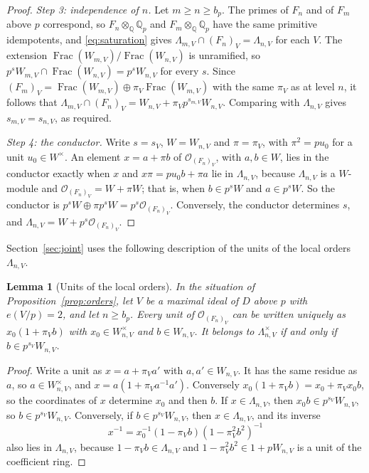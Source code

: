 \documentclass[11pt]{article}
\theoremstyle{plain}
\newtheorem{lemma}[theorem]{Lemma}
\theoremstyle{definition}
\theoremstyle{remark}
\DeclareMathOperator{\Frac}{Frac}
\newcommand{\Q}{\mathbb Q}
\newcommand{\OO}{\mathcal O}
\begin{document}
\begin{proof}
\emph{Step 3: independence of $n$.}  Let $m\geq n\geq b_p$.  The primes
of $F_n$ and of $F_m$ above $p$ correspond, so $F_n\otimes_\Q\Q_p$ and
$F_m\otimes_\Q\Q_p$ have the same primitive idempotents, and
\eqref{eq:saturation} gives
$\Lambda_{m,V}\cap(F_n)_V=\Lambda_{n,V}$ for each $V$.  The extension
$\Frac(W_{m,V})/\Frac(W_{n,V})$ is unramified, so
$p^sW_{m,V}\cap\Frac(W_{n,V})=p^sW_{n,V}$ for every $s$.  Since
$(F_m)_V=\Frac(W_{m,V})\oplus\pi_V\Frac(W_{m,V})$ with the same
$\pi_V$ as at level $n$, it follows that
$\Lambda_{m,V}\cap(F_n)_V=W_{n,V}+\pi_Vp^{s_{m,V}}W_{n,V}$.  Comparing
with $\Lambda_{n,V}$ gives $s_{m,V}=s_{n,V}$, as required.

\emph{Step 4: the conductor.}  Write $s=s_V$, $W=W_{n,V}$ and
$\pi=\pi_V$, with $\pi^2=pu_0$ for a unit $u_0\in W^\times$.  An element
$x=a+\pi b$ of $\OO_{(F_n)_V}$, with $a,b\in W$, lies in the conductor
exactly when $x$ and $x\pi=pu_0b+\pi a$ lie in $\Lambda_{n,V}$, because
$\Lambda_{n,V}$ is a $W$-module and $\OO_{(F_n)_V}=W+\pi W$; that is,
when $b\in p^sW$ and $a\in p^sW$.  So the conductor is
$p^sW\oplus\pi p^sW=p^s\OO_{(F_n)_V}$.  Conversely, the conductor
determines $s$, and $\Lambda_{n,V}=W+p^s\OO_{(F_n)_V}$.
\end{proof}

Section~\ref{sec:joint} uses the following description of the units of
the local orders $\Lambda_{n,V}$.

\begin{lemma}[Units of the local orders]\label{lem:order-units}
In the situation of Proposition~\ref{prop:orders}, let $V$ be a maximal
ideal of $D$ above $p$ with $e(V/p)=2$, and let $n\geq b_p$.  Every unit
of $\OO_{(F_n)_V}$ can be written uniquely as $x_0(1+\pi_Vb)$ with
$x_0\in W_{n,V}^{\times}$ and $b\in W_{n,V}$.  It belongs to
$\Lambda_{n,V}^{\times}$ if and only if $b\in p^{s_V}W_{n,V}$.
\end{lemma}
\begin{proof}
Write a unit as $x=a+\pi_Va'$ with $a,a'\in W_{n,V}$.  It has the same
residue as $a$, so $a\in W_{n,V}^\times$, and $x=a(1+\pi_Va^{-1}a')$.
Conversely $x_0(1+\pi_Vb)=x_0+\pi_Vx_0b$, so the coordinates of $x$
determine $x_0$ and then $b$.  If $x\in\Lambda_{n,V}$, then
$x_0b\in p^{s_V}W_{n,V}$, so $b\in p^{s_V}W_{n,V}$.  Conversely, if
$b\in p^{s_V}W_{n,V}$, then $x\in\Lambda_{n,V}$, and its inverse
\[
 x^{-1}=x_0^{-1}(1-\pi_Vb)(1-\pi_V^2b^2)^{-1}
\]
also lies in $\Lambda_{n,V}$, because $1-\pi_Vb\in\Lambda_{n,V}$ and
$1-\pi_V^2b^2\in1+pW_{n,V}$ is a unit of the coefficient ring.
\end{proof}
\end{document}
